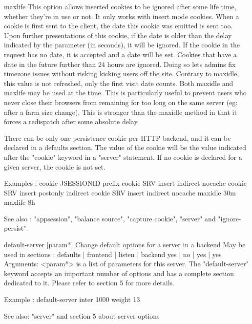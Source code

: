     maxlife   This option allows inserted cookies to be ignored after some life
              time, whether they're in use or not. It only works with insert
              mode cookies. When a cookie is first sent to the client, the date
              this cookie was emitted is sent too. Upon further presentations
              of this cookie, if the date is older than the delay indicated by
              the parameter (in seconds), it will be ignored. If the cookie in
              the request has no date, it is accepted and a date will be set.
              Cookies that have a date in the future further than 24 hours are
              ignored. Doing so lets admins fix timezone issues without risking
              kicking users off the site. Contrary to maxidle, this value is
              not refreshed, only the first visit date counts. Both maxidle and
              maxlife may be used at the time. This is particularly useful to
              prevent users who never close their browsers from remaining for
              too long on the same server (eg: after a farm size change). This
              is stronger than the maxidle method in that it forces a
              redispatch after some absolute delay.

  There can be only one persistence cookie per HTTP backend, and it can be
  declared in a defaults section. The value of the cookie will be the value
  indicated after the "cookie" keyword in a "server" statement. If no cookie
  is declared for a given server, the cookie is not set.

  Examples :
        cookie JSESSIONID prefix
        cookie SRV insert indirect nocache
        cookie SRV insert postonly indirect
        cookie SRV insert indirect nocache maxidle 30m maxlife 8h

  See also : "appsession", "balance source", "capture cookie", "server"
             and "ignore-persist".


default-server [param*]
  Change default options for a server in a backend
  May be used in sections :   defaults | frontend | listen | backend
                                 yes   |    no    |   yes  |   yes
  Arguments:
    <param*>  is a list of parameters for this server. The "default-server"
              keyword accepts an important number of options and has a complete
              section dedicated to it. Please refer to section 5 for more
              details.

  Example :
        default-server inter 1000 weight 13

  See also: "server" and section 5 about server options


